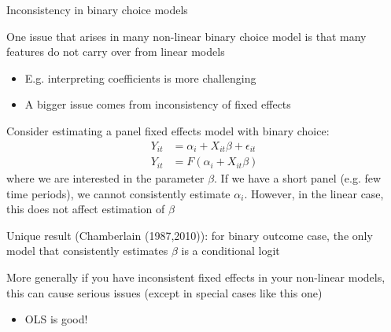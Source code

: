 \documentclass[notes,11pt, aspectratio=169]{beamer}
\newenvironment{wideitemize}{\itemize\addtolength{\itemsep}{10pt}}{\enditemize}
\begin{document}
\begin{frame}{Inconsistency in binary choice models}
  \begin{wideitemize}
  \item One issue that arises in many non-linear binary choice model is that many
    features do not carry over from linear models
    \begin{itemize}
    \item E.g. interpreting coefficients is more challenging
    \item A bigger issue comes from  inconsistency of fixed effects
    \end{itemize}
\vspace{-5pt}    
  \item Consider estimating a panel fixed effects model with binary choice:
    \begin{align*}
      Y_{it} &= \alpha_{i} + X_{it}\beta + \epsilon_{it}\\
      Y_{it} &= F(\alpha_{i} + X_{it}\beta)
    \end{align*}
    where we are interested in the parameter $\beta$. If we have a
    short panel (e.g. few time periods), we cannot consistently
    estimate $\alpha_{i}$. However, in the linear case, this does not
    affect estimation of $\beta$
  \item Unique result (Chamberlain (1987,2010)): for binary
    outcome case, the only model that
    consistently estimates $\beta$ is a conditional logit
  \item More generally if you have inconsistent fixed effects in your
    non-linear models, this can cause serious issues (except in
    special cases like this one)
    \begin{itemize}
    \item OLS is good!
    \end{itemize}
  \end{wideitemize}
\end{frame}
\end{document}
